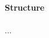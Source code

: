 \documentclass[
	fontsize=10pt, %
	twoside=false, %
	secnumdepth=1, %
  toc=indentunnumbered %
]{kaobook}
\begin{document}



\paragraph{Structure} ...









\end{document}
